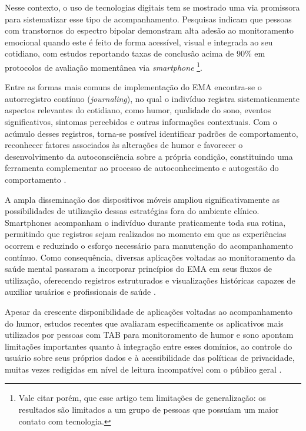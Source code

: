 Nesse contexto, o uso de tecnologias digitais tem se mostrado uma via
promissora para sistematizar esse tipo de acompanhamento. Pesquisas indicam
que pessoas com transtornos do espectro bipolar demonstram alta adesão ao
monitoramento emocional quando este é feito de forma acessível, visual e
integrada ao seu cotidiano, com estudos reportando taxas de conclusão acima
de 90\% em protocolos de avaliação momentânea
via \textit{smartphone} \citep{Ryan2020} \footnote{
  Vale citar porém, que esse artigo tem limitações de generalização:
  os resultados são limitados a um grupo de pessoas que possuíam um maior
  contato com tecnologia.
}.

Entre as formas mais comuns de implementação do EMA encontra-se o
autorregistro contínuo (\textit{journaling}), no qual o indivíduo
registra sistematicamente aspectos relevantes do cotidiano, como
humor, qualidade do sono, eventos significativos, sintomas percebidos
e outras informações contextuais. Com o acúmulo desses registros,
torna-se possível identificar padrões de comportamento, reconhecer fatores
associados às alterações de humor e favorecer o desenvolvimento da
autoconsciência sobre a própria condição, constituindo uma ferramenta
complementar ao processo de autoconhecimento e autogestão do
comportamento \citep{Melton2013}.

A ampla disseminação dos dispositivos móveis ampliou significativamente
as possibilidades de utilização dessas estratégias fora do ambiente
clínico. Smartphones acompanham o indivíduo durante praticamente toda
sua rotina, permitindo que registros sejam realizados no momento em que
as experiências ocorrem e reduzindo o esforço necessário para manutenção
do acompanhamento contínuo. Como consequência, diversas aplicações
voltadas ao monitoramento da saúde mental passaram a incorporar princípios
do EMA em seus fluxos de utilização, oferecendo registros estruturados
e visualizações históricas capazes de auxiliar usuários e profissionais
de saúde \citep{Faurholt:2016}.

Apesar da crescente disponibilidade de aplicações voltadas ao acompanhamento
do humor, estudos recentes que avaliaram especificamente os aplicativos mais
utilizados por pessoas com TAB para monitoramento de humor e sono apontam
limitações importantes quanto à integração entre esses domínios, ao controle
do usuário sobre seus próprios dados e à acessibilidade das políticas de
privacidade, muitas vezes redigidas em nível de leitura incompatível com o
público geral \citep{Morton2022}.

